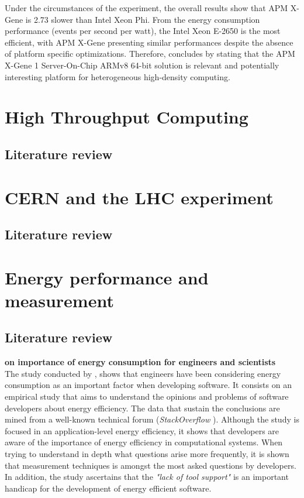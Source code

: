 Under the circumstances of the experiment, the overall results show that APM X-Gene 
is 2.73 slower than Intel Xeon Phi. From the energy consumption performance (events
per second per watt), the Intel Xeon E-2650 is the most efficient, with APM X-Gene
presenting similar performances despite the absence of platform specific 
optimizations. Therefore, \cite{ACAT14ARMDAVID} concludes by stating that the APM
X-Gene 1 Server-On-Chip ARMv8 64-bit solution is relevant and potentially interesting
platform for heterogeneous high-density computing. 

\section{High Throughput Computing}
\subsection{Literature review}



\section{CERN and the LHC experiment}
\subsection{Literature review}



\section{Energy performance and measurement}
\subsection{Literature review}

\textbf{on importance of energy consumption for engineers and scientists}
\\
The study conducted by \cite{QUESTIONS_ENERGY}, shows that engineers have been
considering energy consumption as an important factor when developing software.
It consists on an empirical study that aims to understand the opinions and
problems of software developers about energy efficiency. The data that sustain
the conclusions are  mined from
a well-known technical forum (\textit{StackOverflow} \cite{STACKOVERFLOW}).
Although the study is focused in an application-level energy efficiency, it
shows that developers are aware of the importance of energy efficiency in 
computational systems. When trying to understand in depth what questions arise 
more frequently, it is shown that measurement techniques is amongst the most
asked questions by developers. In addition, the study ascertains that the 
\textit{"lack of tool support"} is an important handicap for the development of 
energy efficient software.






